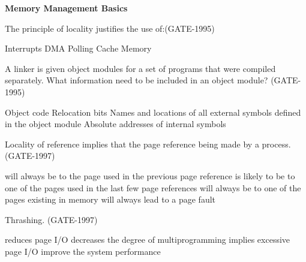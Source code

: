 \centerline{\textbf{ \LARGE Memory Management Basics}}



\begin{questyle}

  \question  The principle of locality justifies the use of:(GATE-1995)

  \begin{oneparchoices}
    \choice Interrupts
    \choice DMA
    \choice Polling
    \correctchoice Cache Memory
  \end{oneparchoices}
\end{questyle}


\begin{questyle}

  \question  A linker is given object modules for a set of programs that were compiled separately. What information need to be included in an object module? (GATE-1995)

  \begin{choices}
    \choice Object code
    \choice Relocation bits
    \choice Names and locations of all external symbols defined in the object module
    \choice Absolute addresses of internal symbols
  \end{choices}
\end{questyle}


\begin{questyle}

  \question Locality of reference implies that the page reference being made by a process. (GATE-1997)

  \begin{choices}
    \choice will always be to the page used in the previous page reference
    \correctchoice is likely to be to one of the pages used in the last few page references
    \choice will always be to one of the pages existing in memory
    \choice will always lead to a page fault
  \end{choices}
\end{questyle}


\begin{questyle}

  \question Thrashing. (GATE-1997)

  \begin{choices}
    \choice reduces page I/O
    \choice decreases the degree of multiprogramming
    \correctchoice implies excessive page I/O
    \choice improve the system performance
  \end{choices}
\end{questyle}

